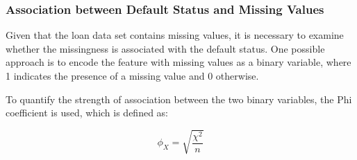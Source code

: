 \newpage
\subsubsection{Association between Default Status and Missing Values}
\label{subsubsec:target-na-ass}

Given that the loan data set contains missing values, it is necessary to examine whether the missingness is associated with the default status. One possible approach is to encode the feature with missing values as a binary variable, where 1 indicates the presence of a missing value and 0 otherwise.

To quantify the strength of association between the two binary variables, the Phi coefficient is used, which is defined as:

\begin{equation}\label{eq}
\phi_{X} = \sqrt{\frac{\chi^{2}}{n}}
\end{equation}

